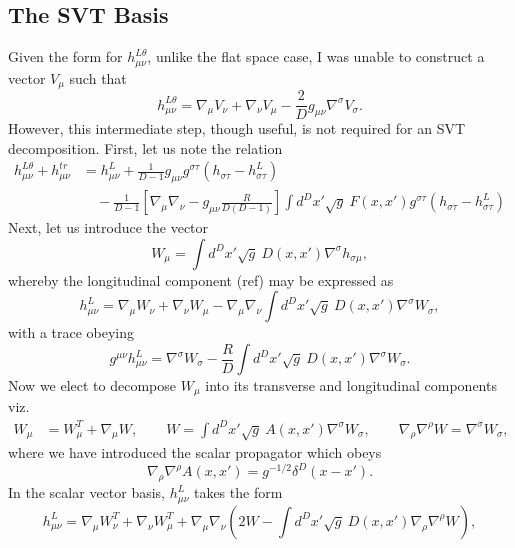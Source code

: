\documentclass[10pt,letterpaper]{article}
\begin{document}
\subsection*{The SVT Basis}
Given the form for $h_{\mu\nu}^{L\theta}$, unlike the flat space case, I was unable to construct a vector $V_\mu$ such that
\begin{equation}
h_{\mu\nu}^{L\theta} = \nabla_\mu V_\nu + \nabla_\nu V_\mu -\frac{2}{D}g_{\mu\nu} \nabla^\sigma V_\sigma. 
\end{equation}
However, this intermediate step, though useful, is not required for an SVT decomposition.
First, let us note the relation
\begin{align}
h_{\mu\nu}^{L\theta} + h^{tr}_{\mu\nu} &= h_{\mu\nu}^L+ \frac{1}{D-1} g_{\mu\nu} g^{\sigma\tau}(h_{\sigma\tau}-h^L_{\sigma\tau})
\nonumber\\
&\quad -\frac{1}{D-1}
\left[ \nabla_\mu\nabla_\nu- g_{\mu\nu}\frac{R}{D(D-1)}\right] \int d^Dx' \sqrt{g}\ F(x,x')g^{\sigma\tau}(h_{\sigma\tau}-h_{\sigma\tau}^L)
\end{align}
Next, let us introduce the vector
\begin{equation}
W_{\mu} = \int d^Dx' \sqrt{g}\ D(x,x')\nabla^\sigma h_{\sigma\mu},
\end{equation}
whereby the longitudinal component (ref) may be expressed as
\begin{equation}
h_{\mu\nu}^L = \nabla_\mu W_\nu + \nabla_\nu W_\mu - \nabla_\mu\nabla_\nu \int d^Dx' \sqrt{g}\ D(x,x')\nabla^\sigma W_\sigma,
\end{equation}
with a trace obeying
\begin{equation}
g^{\mu\nu}h_{\mu\nu}^{L} = \nabla^\sigma W_\sigma - \frac{R}{D} \int d^Dx' \sqrt{g}\ D(x,x')\nabla^\sigma W_\sigma.
\end{equation}
Now we elect to decompose $W_{\mu}$ into its transverse and longitudinal components viz. 
\begin{align}
W_\mu &= W_\mu^T + \nabla_\mu W,\qquad W = \int d^Dx' \sqrt{g}\ A(x,x')\nabla^\sigma W_\sigma, 
\qquad \nabla_\rho \nabla^\rho W = \nabla^\sigma W_\sigma,
\end{align}
where we have introduced the scalar propagator which obeys
\begin{equation}
 \nabla_\rho \nabla^\rho A(x,x') = g^{-1/2}\delta^D(x-x').
\end{equation}
In the scalar vector basis, $h^L_{\mu\nu}$ takes the form
\begin{equation}
h_{\mu\nu}^L =\nabla_\mu W^T_\nu + \nabla_\nu W^T_\mu + \nabla_\mu\nabla_\nu\left( 2W-\int d^Dx' \sqrt{g}\ D(x,x')\nabla_\rho \nabla^\rho W\right),
\end{equation}
\end{document}
